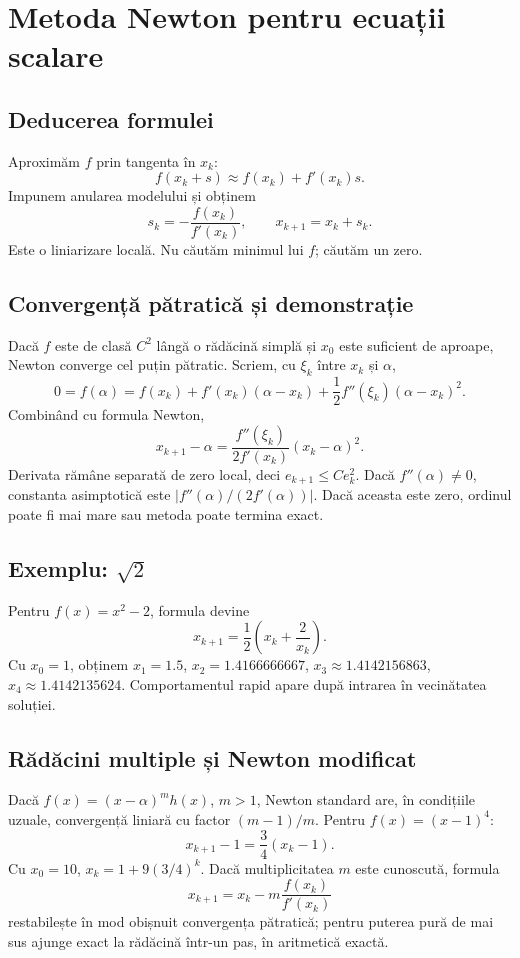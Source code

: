 \documentclass[11pt,a4paper]{article}
\begin{document}
\section{Metoda Newton pentru ecuații scalare}
\subsection{Deducerea formulei}
Aproximăm $f$ prin tangenta în $x_k$:
\[
f(x_k+s)\approx f(x_k)+f'(x_k)s.
\]
Impunem anularea modelului și obținem
\[
s_k=-\frac{f(x_k)}{f'(x_k)},\qquad x_{k+1}=x_k+s_k.
\]
Este o liniarizare locală. Nu căutăm minimul lui $f$; căutăm un zero.

\subsection{Convergență pătratică și demonstrație}
Dacă $f$ este de clasă $C^2$ lângă o rădăcină simplă și $x_0$ este suficient de aproape, Newton converge cel puțin pătratic. Scriem, cu $\xi_k$ între $x_k$ și $\alpha$,
\[
0=f(\alpha)=f(x_k)+f'(x_k)(\alpha-x_k)
 +\frac12f''(\xi_k)(\alpha-x_k)^2.
\]
Combinând cu formula Newton,
\[
x_{k+1}-\alpha=\frac{f''(\xi_k)}{2f'(x_k)}(x_k-\alpha)^2.
\]
Derivata rămâne separată de zero local, deci $e_{k+1}\le C e_k^2$. Dacă $f''(\alpha)\ne0$, constanta asimptotică este $|f''(\alpha)/(2f'(\alpha))|$. Dacă aceasta este zero, ordinul poate fi mai mare sau metoda poate termina exact.

\subsection{Exemplu: $\sqrt2$}
Pentru $f(x)=x^2-2$, formula devine
\[
x_{k+1}=\frac12\left(x_k+\frac2{x_k}\right).
\]
Cu $x_0=1$, obținem $x_1=1.5$, $x_2=1.4166666667$, $x_3\approx1.4142156863$, $x_4\approx1.4142135624$. Comportamentul rapid apare după intrarea în vecinătatea soluției.

\subsection{Rădăcini multiple și Newton modificat}
Dacă $f(x)=(x-\alpha)^m h(x)$, $m>1$, Newton standard are, în condițiile uzuale, convergență liniară cu factor $(m-1)/m$. Pentru $f(x)=(x-1)^4$:
\[
x_{k+1}-1=\frac34(x_k-1).
\]
Cu $x_0=10$, $x_k=1+9(3/4)^k$. Dacă multiplicitatea $m$ este cunoscută, formula
\[
x_{k+1}=x_k-m\frac{f(x_k)}{f'(x_k)}
\]
restabilește în mod obișnuit convergența pătratică; pentru puterea pură de mai sus ajunge exact la rădăcină într-un pas, în aritmetică exactă.
\end{document}
